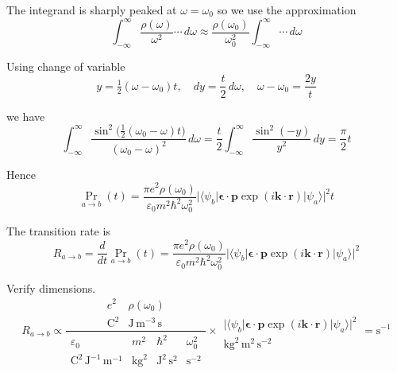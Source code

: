 The integrand is sharply peaked at $\omega=\omega_0$ so we use the approximation
\begin{equation*}
\int_{-\infty}^\infty\frac{\rho(\omega)}{\omega^2}
\cdots
\,d\omega
\approx\frac{\rho(\omega_0)}{\omega_0^2}
\int_{-\infty}^\infty
\cdots
\,d\omega
\end{equation*}

Using change of variable
\begin{equation*}
y=\tfrac{1}{2}(\omega-\omega_0)t,\quad
dy=\frac{t}{2}\,d\omega,\quad
\omega-\omega_0=\frac{2y}{t}
\end{equation*}

we have
\begin{equation*}
\int_{-\infty}^\infty
\frac{\sin^2\bigl(\tfrac{1}{2}(\omega_0-\omega)t\bigr)}{(\omega_0-\omega)^2}\,d\omega
=\frac{t}{2}\int_{-\infty}^\infty\frac{\sin^2(-y)}{y^2}\,dy
=\frac{\pi}{2}t
\end{equation*}

Hence
\begin{equation*}
\Pr_{a\rightarrow b}(t)
=\frac{\pi e^2\rho(\omega_0)}{\varepsilon_0m^2\hbar^2\omega_0^2}
\bigl|\langle\psi_b|\boldsymbol{\epsilon}\cdot\mathbf p\exp(i\mathbf k\cdot\mathbf r)|\psi_a\rangle\bigr|^2
t
\end{equation*}

The transition rate is
\begin{equation*}
R_{a\rightarrow b}=\frac{d}{dt}\Pr_{a\rightarrow b}(t)
=\frac{\pi e^2\rho(\omega_0)}{\varepsilon_0m^2\hbar^2\omega_0^2}
\bigl|\langle\psi_b|\boldsymbol{\epsilon}\cdot\mathbf p\exp(i\mathbf k\cdot\mathbf r)|\psi_a\rangle\bigr|^2
\end{equation*}

Verify dimensions.
\begin{equation*}
R_{a\rightarrow b}\propto
\frac{\begin{matrix}
e^2 & \rho(\omega_0)
\\
\text{C}^2 & \text{J}\,\text{m}^{-3}\,\text{s}
\end{matrix}
}{\begin{matrix}
\varepsilon_0 & m^2 & \hbar^2 & \omega_0^2
\\
\text{C}^2\,\text{J}^{-1}\,\text{m}^{-1}
& \text{kg}^2 & \text{J}^2\,\text{s}^2 & \text{s}^{-2}
\end{matrix}}
\times
\begin{matrix}
\\
\bigl|\langle\psi_b|\boldsymbol{\epsilon}\cdot\mathbf p\exp(i\mathbf k\cdot\mathbf r)|\psi_a\rangle\bigr|^2
\\
\text{kg}^2\,\text{m}^2\,\text{s}^{-2}
\end{matrix}
=\text{s}^{-1}
\end{equation*}



